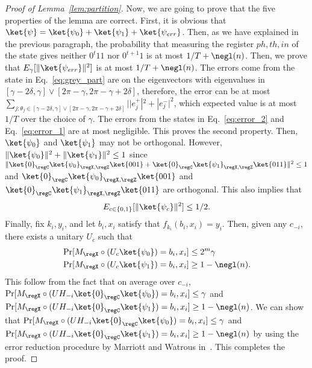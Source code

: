 \begin{proof}[Proof of Lemma~\ref{lem:partition}]
Now, we are going to prove that the five properties of the lemma are correct. First, it is obvious that $\ket{\psi} = \ket{\psi_0}+\ket{\psi_1}+\ket{\psi_{err}}$. Then, as we have explained in the previous paragraph, the probability that measuring the register $ph,th,in$ of the state gives neither $0^t11$ nor $0^{t+1}1$ is at most $1/T+\negl(n)$. Then, we prove that $E_{\gamma}[\|\ket{\psi_{err}}\|^2]$ is at most $1/T+\negl(n)$. The errors come from the state in Eq.~\ref{eq:grey_part} are on the eigenvectors with eigenvalues in $[\gamma-2\delta,\gamma]\vee[2\pi - \gamma,2\pi - \gamma+2\delta]$, therefore, the error can be at most $\sum_{j:\theta_j \in [\gamma-2\delta,\gamma]\vee[2\pi - \gamma,2\pi - \gamma+2\delta]}| |e_j^+|^2+|e_j^-|^2$, which expected value is at most $1/T$ over the choice of $\gamma$. The errors from the states in Eq.~\ref{eq:error_2} and Eq.~\ref{eq:error_1} are at most negligible. This proves the second property.  Then, $\ket{\psi_0}$ and $\ket{\psi_1}$ may not be orthogonal. However, $\|\ket{\psi_0}\|^2+ \|\ket{\psi_1}\|^2\leq 1$ since $\|\ket{0}_{\regC}\ket{\psi_{0}}_{\regX,\regZ}\ket{001}+ \ket{0}_{\regC}\ket{\psi_{1}}_{\regX,\regZ}\ket{011}\|^2 \leq1$ and  $\ket{0}_{\regC}\ket{\psi_{0}}_{\regX,\regZ}\ket{001}$ and $ \ket{0}_{\regC}\ket{\psi_{1}}_{\regX,\regZ}\ket{011}$ are orthogonal. This also implies that 
\begin{align*}
    E_{c\in \{0,1\}}[ \|\ket{\psi_{c}}\|^2 ] \leq 1/2. 
\end{align*}
Finally, fix $k_i,y_i$, and let $b_i,x_i$ satisfy that $f_{k_i}(b_i,x_i) = y_i$. 
Then, given any $c_{-i}$, there exists a unitary $U_c$ such that
\begin{align*}
    & \Pr[M_{\regX}\circ(U_{c} \ket{\psi_0}) = b_i,x_i] \leq 2^m \gamma\\ 
    &\Pr[M_{\regX}\circ(U_{c} \ket{\psi_1}) = b_i,x_i] \geq 1-\negl(n).
\end{align*}
This follow from the fact that on average over $c_{-i}$,  $\Pr[M_{\regX}\circ(UH_{-i} \ket{0}_{\regC}\ket{\psi_0}) = b_i,x_i] \leq \gamma$ and $\Pr[M_{\regX}\circ(UH_{-i} \ket{0}_{\regC}\ket{\psi_1}) = b_i,x_i] \geq 1-\negl(n)$. We can show that $\Pr[M_{\regX}\circ(UH_{-i} \ket{0}_{\regC}\ket{\psi_0}) = b_i,x_i] \leq \gamma$ and $\Pr[M_{\regX}\circ(UH_{-i} \ket{0}_{\regC}\ket{\psi_1}) = b_i,x_i] \geq 1-\negl(n)$ by using the error reduction procedure by Marriott and Watrous in~\cite{MW05}. This completes the proof. 







\end{proof}
